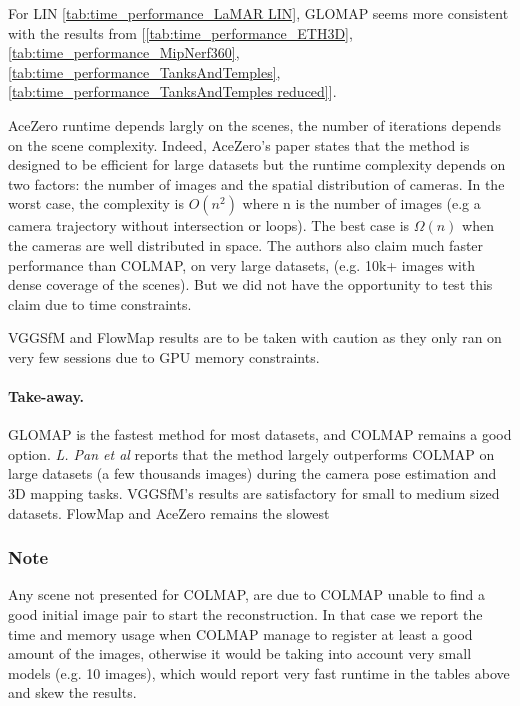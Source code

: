 For LIN \ref{tab:time_performance_LaMAR LIN}, GLOMAP seems more consistent with the results from [\ref{tab:time_performance_ETH3D}, \ref{tab:time_performance_MipNerf360}, \ref{tab:time_performance_TanksAndTemples}, \ref{tab:time_performance_TanksAndTemples reduced}].

AceZero runtime depends largly on the scenes, the number of iterations depends on the scene complexity.
Indeed, AceZero's paper \cite{brachmann2024acezero} states that the method is designed to be efficient for large datasets but the runtime complexity depends on two factors: the number of images and the spatial distribution of cameras.
In the worst case, the complexity is $O(n^2)$ where n is the number of images (e.g a camera trajectory without intersection or loops). 
The best case is $\Omega(n)$ when the cameras are well distributed in space.
The authors also claim much faster performance than COLMAP, on very large datasets, (e.g. 10k+ images with dense coverage of the scenes). 
But we did not have the opportunity to test this claim due to time constraints.

VGGSfM and FlowMap results are to be taken with caution as they only ran on very few sessions due to GPU memory constraints.

\paragraph{Take-away.}
GLOMAP is the fastest method for most datasets, and COLMAP remains a good option. 
\textit{L. Pan et al} \cite{pan2024glomap} reports that the method largely outperforms COLMAP on large datasets (a few thousands images) during the camera pose estimation and 3D mapping tasks.
VGGSfM's results are satisfactory for small to medium sized datasets.
FlowMap and AceZero remains the slowest

\subsubsection{Note}\label{sec:note}
Any scene not presented for COLMAP, are due to COLMAP unable to find a good initial image pair to start the reconstruction. 
In that case we report the time and memory usage when COLMAP manage to register at least a good amount of the images, 
otherwise it would be taking into account very small models (e.g. 10 images), which would report very fast runtime in the tables above and skew the results.
